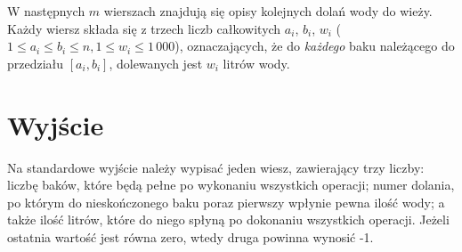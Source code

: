 \documentclass[zad,zawodnik,utf8]{sinol}
\begin{document}
\begin{tasktext}
W następnych $m$ wierszach znajdują się opisy kolejnych dolań wody do wieży. Każdy wiersz składa się z trzech
liczb całkowitych $a_i$, $b_i$, $w_i$ ($1 \leq a_i \leq b_i \leq n, 1 \leq w_i \leq 1\,000$), oznaczających, że do \textit{każdego}
baku należącego do przedziału $[a_i, b_i]$, dolewanych jest $w_i$ litrów wody.

  \section{Wyjście}
    Na standardowe wyjście należy wypisać jeden wiesz, zawierający trzy liczby: liczbę baków, które będą pełne po wykonaniu
    wszystkich operacji; numer dolania, po którym do nieskończonego baku poraz pierwszy wpłynie pewna ilość wody; 
    a także ilość litrów, które do niego spłyną po dokonaniu wszystkich operacji. Jeżeli ostatnia wartość jest równa zero, 
    wtedy druga powinna wynosić -1.
    
     \makecompactexample

  \end{tasktext}
\end{document}
